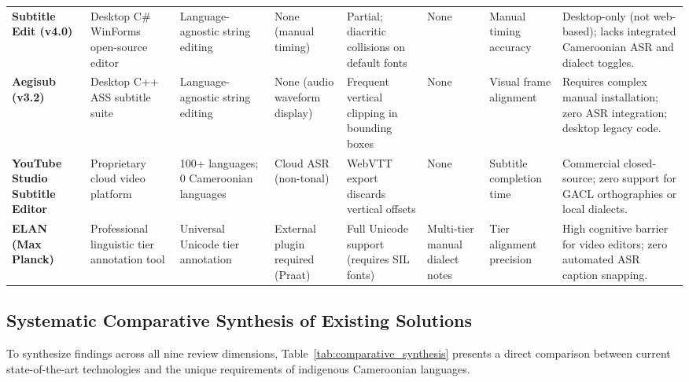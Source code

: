 \documentclass[a4paper,11pt]{article}
\begin{document}
\begin{table}[t]
\begin{tabular}{p{2.0cm} p{2.2cm} p{2.2cm} p{1.5cm} p{1.8cm} p{1.5cm} p{1.7cm} >{\raggedright\arraybackslash}p{3.2cm}}
\addlinespace
\textbf{Subtitle Edit (v4.0)} & Desktop C\# WinForms open-source editor & Language-agnostic string editing & None (manual timing) & Partial; diacritic collisions on default fonts & None & Manual timing accuracy & Desktop-only (not web-based); lacks integrated Cameroonian ASR and dialect toggles. \\
\addlinespace
\textbf{Aegisub (v3.2)} & Desktop C++ ASS subtitle suite & Language-agnostic string editing & None (audio waveform display) & Frequent vertical clipping in bounding boxes & None & Visual frame alignment & Requires complex manual installation; zero ASR integration; desktop legacy code. \\
\addlinespace
\textbf{YouTube Studio Subtitle Editor} & Proprietary cloud video platform & 100+ languages; 0 Cameroonian languages & Cloud ASR (non-tonal) & WebVTT export discards vertical offsets & None & Subtitle completion time & Commercial closed-source; zero support for GACL orthographies or local dialects. \\
\addlinespace
\textbf{ELAN (Max Planck)}~\cite{wittenburg2006elan} & Professional linguistic tier annotation tool & Universal Unicode tier annotation & External plugin required (Praat) & Full Unicode support (requires SIL fonts) & Multi-tier manual dialect notes & Tier alignment precision & High cognitive barrier for video editors; zero automated ASR caption snapping. \\
\bottomrule
\end{tabular}
\end{table}

\subsection{Systematic Comparative Synthesis of Existing Solutions}
\label{sec:chap2_synthesis}

To synthesize findings across all nine review dimensions, Table~\ref{tab:comparative_synthesis} presents a direct comparison between current state-of-the-art technologies and the unique requirements of indigenous Cameroonian languages.
\end{document}
